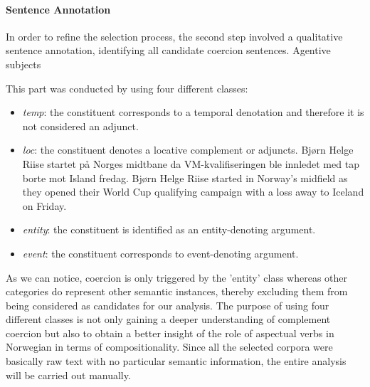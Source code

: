 \documentclass{article}
\begin{document}
\paragraph{Sentence Annotation}
In order to refine the selection process, the second step involved a qualitative sentence annotation, identifying all candidate coercion sentences. 
Agentive subjects


This part was conducted by using four different classes:
\begin{itemize}
    \item \textit{temp}: the constituent corresponds to a temporal denotation and therefore it is not considered an adjunct. 
    \item \textit{loc}: the constituent denotes a locative complement or adjuncts.  Bjørn Helge Riise startet på Norges midtbane da VM-kvalifiseringen ble innledet med tap borte mot Island fredag. Bjørn Helge Riise started in Norway's midfield as they opened their World Cup qualifying campaign with a loss away to Iceland on Friday.
    \item \textit{entity}: the constituent is identified as  an entity-denoting argument.
    \item \textit{event}: the constituent corresponds to event-denoting argument.
\end{itemize}
As we can notice, coercion is only triggered by the 'entity' class whereas other categories do represent other semantic instances, thereby excluding them from being considered as candidates for our analysis. The purpose of using four different classes is not only gaining a deeper understanding of complement coercion but also to obtain a better insight of the role of aspectual verbs in Norwegian in terms of compositionality. Since all the selected corpora were basically raw text with no particular semantic information, the entire analysis will be carried out manually. 



\end{document}

